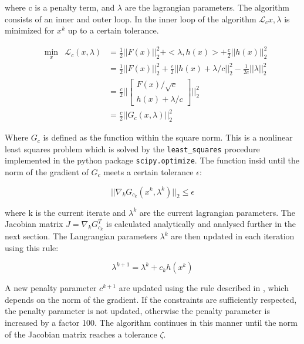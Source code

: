 where c is a penalty term, and $\lambda$ are the lagrangian parameters. The algorithm consists of an inner and outer loop. In the inner loop of the algorithm $\mathcal{L}_c{x,\lambda}$ is minimized for $x^k$ up to a certain tolerance.

\begin{equation}
	\begin{aligned}
	 & \underset{x}{\text{min}} & \mathcal{L}_c(x,\lambda) 
	     &= \frac{1}{2} ||F(x)||^2_2 + <\lambda,h(x)> + \frac{c}{2} || h(x) ||^2_2 \\
	 & & &= \frac{1}{2} ||F(x)||^2_2 + \frac{c}{2} ||h(x) + \lambda/c ||^2_2 - \frac{1}{2c} ||\lambda||^2_2 \\
	 & & &= \frac{c}{2} \Big|\Big|
		\begin{bmatrix}
			F(x)/\sqrt{c} \\
			h(x) + \lambda/c
		\end{bmatrix} \Big|\Big|^2_2 \\
	 & & &= \frac{c}{2} ||G_c(x,\lambda)||^2_2
	\end{aligned}
	\label{loss}
\end{equation}

Where $G_c$ is defined as the function within the square norm. This is a nonlinear least squares problem which is solved by the \texttt{least\_squares} procedure implemented in the python package \texttt{scipy.optimize}. The function insid until the norm of the gradient of $G_c$ meets a certain tolerance $\epsilon$:

\begin{equation}
|| \nabla_kG_{c_k}(x^k,\lambda^k)||_2 \leq \epsilon
\end{equation}
 
where k is the current iterate and $\lambda^k$ are the current lagrangian parameters. The Jacobian matrix $J = \nabla_kG_{c_k}^T$ is calculated analytically and analysed further in the next section. The Langrangian parameters $\lambda^k$ are then updated in each iteration using this rule:

\begin{equation}
\lambda^{k+1} = \lambda^k + c_kh(x^k)
\end{equation}

A new penalty parameter $c^{k+1}$ are updated using the rule described in \cite{}, which depends on the norm of the gradient. If the constraints are sufficiently respected, the penalty parameter is not updated, otherwise the penalty parameter is increased by a factor 100. The algorithm continues in this manner until the norm of the Jacobian matrix reaches a tolerance $\zeta$.


